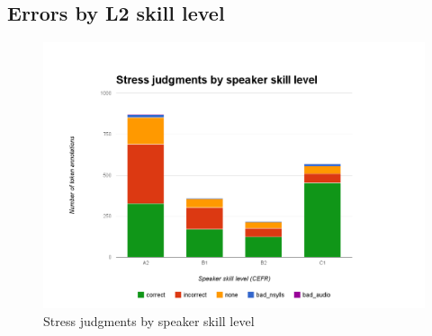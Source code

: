 		
		\subsection{Errors by L2 skill level}
		\label{sec:results:level}
		
			
			\begin{figure}[htb]
				\centering
				\includegraphics[width=\textwidth]{img/annotation/skillLevelBars}
				\caption{Stress judgments by speaker skill level }
				\label{fig:levelbars}
			\end{figure}
		
